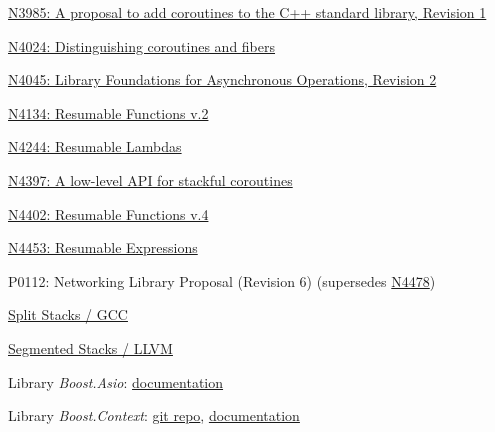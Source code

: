 \begin{thebibliography}{99}

        \href{http://www.open-std.org/jtc1/sc22/wg21/docs/papers/2014/n3985.pdf}
        {N3985: A proposal to add coroutines to the C++ standard library, Revision 1}

        \href{http://www.open-std.org/jtc1/sc22/wg21/docs/papers/2014/n4024.pdf}
        {N4024: Distinguishing coroutines and fibers}

        \href{http://www.open-std.org/jtc1/sc22/wg21/docs/papers/2014/n4045.pdf}
        {N4045: Library Foundations for Asynchronous Operations, Revision 2}

        \href{http://www.open-std.org/jtc1/sc22/wg21/docs/papers/2014/n4134.pdf}
        {N4134: Resumable Functions v.2}

        \href{http://www.open-std.org/jtc1/sc22/wg21/docs/papers/2014/n4244.pdf}
        {N4244: Resumable Lambdas}

        \href{http://www.open-std.org/jtc1/sc22/wg21/docs/papers/2015/n4397.pdf}
        {N4397: A low-level API for stackful coroutines}

        \href{https://isocpp.org/files/papers/N4402.pdf}
        {N4402: Resumable Functions v.4}

        \href{http://www.open-std.org/jtc1/sc22/wg21/docs/papers/2015/n4453.pdf}
        {N4453: Resumable Expressions}

        P0112: Networking Library Proposal (Revision 6) (supersedes
        \href{http://www.open-std.org/jtc1/sc22/wg21/docs/papers/2015/n4478.html}
        {N4478})

        \href{http://gcc.gnu.org/wiki/SplitStacks}
        {Split Stacks / GCC}

        \href{http://llvm.org/releases/3.0/docs/SegmentedStacks.html}
        {Segmented Stacks / LLVM}

        Library \emph{Boost.Asio}:
        \href{http://www.boost.org/doc/libs/release/doc/html/boost\_asio.html} {documentation}

        Library \emph{Boost.Context}:
        \href{https://github.com/boostorg/context} {git repo},
        \href{http://www.boost.org/doc/libs/release/libs/context/doc/html/index.html} {documentation}


\end{thebibliography}
